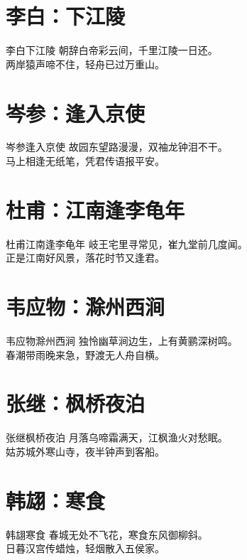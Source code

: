 \documentclass[12pt,oneside,a5paper]{book}
\begin{document}
\chapter{李白：下江陵}
\begin{poemzh}{李白}{下江陵}
朝辞白帝彩云间，千里江陵一日还。\\
两岸猿声啼不住，轻舟已过万重山。\\ 
\end{poemzh}

\chapter{岑参：逢入京使}
\begin{poemzh}{岑参}{逢入京使}
故园东望路漫漫，双袖龙钟泪不干。\\
马上相逢无纸笔，凭君传语报平安。\\ 
\end{poemzh}

\chapter{杜甫：江南逢李龟年}
\begin{poemzh}{杜甫}{江南逢李龟年}
岐王宅里寻常见，崔九堂前几度闻。\\
正是江南好风景，落花时节又逢君。\\ 
\end{poemzh}

\chapter{韦应物：滁州西涧}
\begin{poemzh}{韦应物}{滁州西涧}
独怜幽草涧边生，上有黄鹂深树鸣。\\
春潮带雨晚来急，野渡无人舟自横。\\ 
\end{poemzh}

\chapter{张继：枫桥夜泊}
\begin{poemzh}{张继}{枫桥夜泊}
月落乌啼霜满天，江枫渔火对愁眠。\\
姑苏城外寒山寺，夜半钟声到客船。\\ 
\end{poemzh}

\chapter{韩翃：寒食}
\begin{poemzh}{韩翃}{寒食}
春城无处不飞花，寒食东风御柳斜。\\
日暮汉宫传蜡烛，轻烟散入五侯家。\\ 
\end{poemzh}
\end{document}
